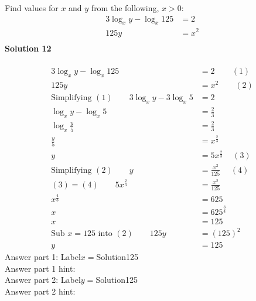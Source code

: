 \documentclass{article}
\begin{document}
Find values for $x$ and $y$ from the following, $x>0$:
\begin{align*}
3\log_{x}y-\log_{x}125&=2\\[2pt]
125y&=x^2\\[-22pt]
\end{align*}
\noindent\textbf{Solution 12}\\[2pt]
\\[-35pt]\begin{align*}
3\log_{x}y-\log_{x}125&=2\hspace{25pt} (1)\\[2pt]
125y&=x^2\qquad (2)\\[2pt]
\text{Simplifying} \,\, (1)\qquad 3\log_{x}y-3\log_{x}5&=2\\[2pt]
\log_{x}y-\log_{x}5&=\displaystyle\frac{2}{3}\\[2pt]
\log_{x}\displaystyle\frac{y}{5}&=\displaystyle\frac{2}{3}\\[2pt]
\displaystyle\frac{y}{5}&=x^{\displaystyle\frac{2}{3}}\\[2pt]
y&=5x^{\displaystyle\frac{2}{3}}\hspace{14pt}(3)\\[2pt]
\text{Simplifying}\,\,(2)\qquad y&=\displaystyle\frac{x^2}{125}\hspace{15pt}(4)\\[2pt]
(3) = (4)\qquad 5x^{\displaystyle\frac{2}{3}}&=\displaystyle\frac{x^2}{125}\\[2pt]
x^{\displaystyle\frac{4}{3}}&=625\\[2pt]
x&=625^{\displaystyle\frac{3}{4}}\\[2pt]
x&=125\\[12pt]
\text{Sub}\,\,x=125\,\,\text{into}\,\,(2)\qquad 125y&=(125)^2\\[2pt]
y&=125
\end{align*}
Answer part 1: \hspace{10pt}Label\hspace{10pt}$x=$\hspace{10pt}Solution\hspace{10pt}125\\
Answer part 1 hint: \hspace{15pt}\\
Answer part 2: \hspace{10pt}Label\hspace{10pt}$y=$\hspace{10pt}Solution\hspace{10pt}125\\
Answer part 2 hint: \hspace{15pt}\\
\end{document}
